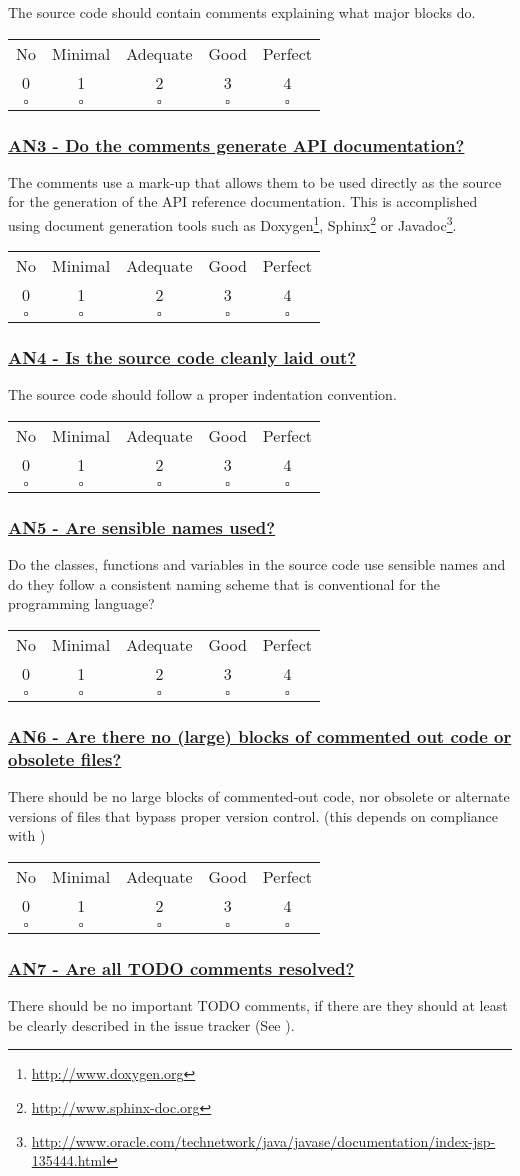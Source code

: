 \documentclass[a4paper,11pt]{article}
\newcommand{\criterion}[2]{\subsubsection*{\underline{#1 - #2}}\label{id:#1}}
\newcommand\CheckTable{%
  \begin{tabular}{ccccc}
    No & Minimal & Adequate & Good & Perfect \\
    0 & 1 & 2 & 3 & 4 \\
    \hline
    $\square$ & $\square$ & $\square$ & $\square$ & $\square$ \\
  \end{tabular}%
}
\newcommand{\refcrit}[1]{%
 \framebox[1.1\width]{\hyperref[id:#1]{#1}}
}
\begin{document}
The source code should contain comments explaining what major blocks do.

\CheckTable

\newcommand{\anThreeID}{AN3}
\newcommand{\anThreeText}{Do the comments generate API documentation?}
\criterion{\anThreeID}{\anThreeText}

The comments use a mark-up that allows them to be used directly as the
source for the generation of the API reference documentation. This is
%
%
%
accomplished using document generation tools such as Doxygen\footnote{\url{http://www.doxygen.org}}, Sphinx\footnote{\url{http://www.sphinx-doc.org}} or
Javadoc\footnote{\url{http://www.oracle.com/technetwork/java/javase/documentation/index-jsp-135444.html}}.

\CheckTable

\newcommand{\anFourID}{AN4}
\newcommand{\anFourText}{Is the source code cleanly laid out?}
\criterion{\anFourID}{\anFourText}

The source code should follow a proper indentation convention. 

\CheckTable

\newcommand{\anFiveID}{AN5}
\newcommand{\anFiveText}{Are sensible names used?}
\criterion{\anFiveID}{\anFiveText}

Do the classes, functions and variables in the source code use sensible names
and do they follow a consistent naming scheme that is conventional for the
programming language?

\CheckTable

\newcommand{\anSixID}{AN6}
\newcommand{\anSixText}{Are there no (large) blocks of commented out code or obsolete files?}
\criterion{\anSixID}{\anSixText}

There should be no large blocks of commented-out code, nor obsolete or
alternate versions of files that bypass proper version control.
(this depends on compliance with \refcrit{AC1})

\CheckTable

\newcommand{\anSevenID}{AN7}
\newcommand{\anSevenText}{Are all TODO comments resolved?}
\criterion{\anSevenID}{\anSevenText}

There should be no important TODO comments, if there are they should at least be
clearly described in the issue tracker (See \refcrit{SP2}).
\end{document}
